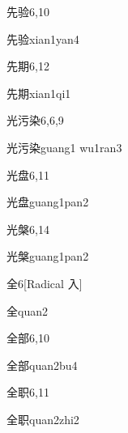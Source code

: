 \begin{entry}{先验}{6,10}
  \begin{phonetics}{先验}{xian1yan4}
  \end{phonetics}
\end{entry}

\begin{entry}{先期}{6,12}
  \begin{phonetics}{先期}{xian1qi1}
  \end{phonetics}
\end{entry}

\begin{entry}{光污染}{6,6,9}
  \begin{phonetics}{光污染}{guang1 wu1ran3}
  \end{phonetics}
\end{entry}

\begin{entry}{光盘}{6,11}
  \begin{phonetics}{光盘}{guang1pan2}
  \end{phonetics}
\end{entry}

\begin{entry}{光槃}{6,14}
  \begin{phonetics}{光槃}{guang1pan2}
  \end{phonetics}
\end{entry}

\begin{entry}{全}{6}[Radical 入]
  \begin{phonetics}{全}{quan2}
  \end{phonetics}
\end{entry}

\begin{entry}{全部}{6,10}
  \begin{phonetics}{全部}{quan2bu4}
  \end{phonetics}
\end{entry}

\begin{entry}{全职}{6,11}
  \begin{phonetics}{全职}{quan2zhi2}
  \end{phonetics}
\end{entry}

